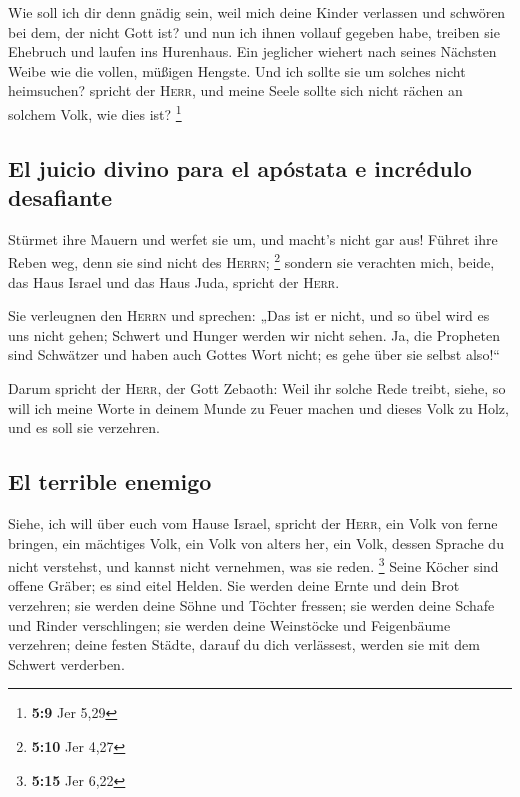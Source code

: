  Wie soll ich dir denn gnädig sein, weil mich deine Kinder
verlassen und schwören bei dem, der nicht Gott ist? und nun ich ihnen
vollauf gegeben habe, treiben sie Ehebruch und laufen ins Hurenhaus.
 Ein jeglicher wiehert nach seines Nächsten Weibe wie die
vollen, müßigen Hengste.  Und ich sollte sie um solches
nicht heimsuchen? spricht der \textsc{Herr}, und meine Seele sollte sich
nicht rächen an solchem Volk, wie dies ist? \footnote{\textbf{5:9} Jer
  5,29}

\hypertarget{el-juicio-divino-para-el-apuxf3stata-e-incruxe9dulo-desafiante}{%
\subsection{El juicio divino para el apóstata e incrédulo
desafiante}\label{el-juicio-divino-para-el-apuxf3stata-e-incruxe9dulo-desafiante}}

 Stürmet ihre Mauern und werfet sie um, und macht's nicht
gar aus! Führet ihre Reben weg, denn sie sind nicht des \textsc{Herrn};
\footnote{\textbf{5:10} Jer 4,27}  sondern sie verachten
mich, beide, das Haus Israel und das Haus Juda, spricht der
\textsc{Herr}.

 Sie verleugnen den \textsc{Herrn} und sprechen: „Das ist
er nicht, und so übel wird es uns nicht gehen; Schwert und Hunger werden
wir nicht sehen.  Ja, die Propheten sind Schwätzer und
haben auch Gottes Wort nicht; es gehe über sie selbst also!{}``

 Darum spricht der \textsc{Herr}, der Gott Zebaoth: Weil
ihr solche Rede treibt, siehe, so will ich meine Worte in deinem Munde
zu Feuer machen und dieses Volk zu Holz, und es soll sie verzehren.

\hypertarget{el-terrible-enemigo}{%
\subsection{El terrible enemigo}\label{el-terrible-enemigo}}

 Siehe, ich will über euch vom Hause Israel, spricht der
\textsc{Herr}, ein Volk von ferne bringen, ein mächtiges Volk, ein Volk
von alters her, ein Volk, dessen Sprache du nicht verstehst, und kannst
nicht vernehmen, was sie reden. \footnote{\textbf{5:15} Jer 6,22}
 Seine Köcher sind offene Gräber; es sind eitel Helden.
 Sie werden deine Ernte und dein Brot verzehren; sie
werden deine Söhne und Töchter fressen; sie werden deine Schafe und
Rinder verschlingen; sie werden deine Weinstöcke und Feigenbäume
verzehren; deine festen Städte, darauf du dich verlässest, werden sie
mit dem Schwert verderben.

